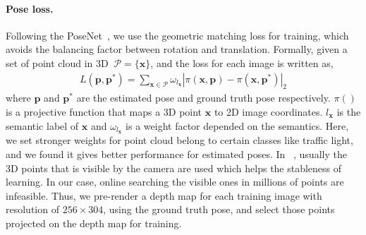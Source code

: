 \documentclass[10pt,twocolumn,letterpaper]{article}
\newcommand{\ve}[1]{{\mathbf #1}} %
\newcommand{\hua}[1]{{\mathcal #1}}
\begin{document}
\paragraph{Pose loss.} 
Following the PoseNet~\cite{}, we use the geometric matching loss for training, which avoids the balancing factor between rotation and translation. 
Formally, given a set of point cloud in 3D $~\hua{P}=\{\ve{x}\}$, and the loss for each image is written as,
\begin{align}
L(\ve{p}, \ve{p}^*) = \sum_{\ve{x} \in \hua{P}}\omega_{l_\ve{x}}|\pi(\ve{x}, \ve{p}) - \pi(\ve{x}, \ve{p}^*)|_2
\label{eq:proj_loss}
\end{align}
where $\ve{p}$ and $\ve{p}^*$ are the estimated pose and ground truth pose respectively. $\pi()$ is a projective function that maps a 3D point $\ve{x}$ to 2D image coordinates. $l_\ve{x}$ is the semantic label of $\ve{x}$ and $\omega_{l_\ve{x}}$ is a weight factor depended on the semantics. Here, we set stronger weights for point cloud belong to certain classes like traffic light, and we found it gives better performance for estimated poses.
In ~\cite{kendall2017geometric}, usually the 3D points that is visible by the camera are used which helps the stableness of learning. In our case, online searching the visible ones in millions of points are infeasible. 
Thus, we pre-render a depth map for each training image with resolution of $256 \times 304$, using the ground truth pose, and select those points projected on the depth map for training.

\end{document}
